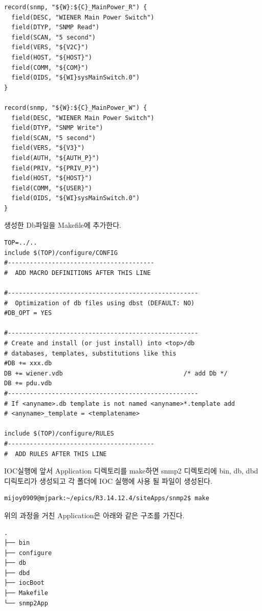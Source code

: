 \documentclass[11pt
  , a4paper
  , article
  , oneside
]{memoir}
\begin{document}
{\scriptsize
\begin{lstlisting}[style=termstyle]
record(snmp, "${W}:${C}_MainPower_R") {
  field(DESC, "WIENER Main Power Switch")
  field(DTYP, "SNMP Read")
  field(SCAN, "5 second")
  field(VERS, "${V2C}")
  field(HOST, "${HOST}")
  field(COMM, "${COM}")
  field(OIDS, "${WI}sysMainSwitch.0")
}

record(snmp, "${W}:${C}_MainPower_W") {
  field(DESC, "WIENER Main Power Switch")
  field(DTYP, "SNMP Write")
  field(SCAN, "5 second")
  field(VERS, "${V3}")
  field(AUTH, "${AUTH_P}")
  field(PRIV, "${PRIV_P}")
  field(HOST, "${HOST}")
  field(COMM, "${USER}")
  field(OIDS, "${WI}sysMainSwitch.0")
}
\end{lstlisting}
}

\hfill

생성한 Db파일을 Makefile에 추가한다.

{\scriptsize
\begin{lstlisting}[style=termstylenumber]
TOP=../..
include $(TOP)/configure/CONFIG
#----------------------------------------
#  ADD MACRO DEFINITIONS AFTER THIS LINE

#----------------------------------------------------
#  Optimization of db files using dbst (DEFAULT: NO)
#DB_OPT = YES

#----------------------------------------------------
# Create and install (or just install) into <top>/db
# databases, templates, substitutions like this
#DB += xxx.db
DB += wiener.vdb                                 /* add Db */
DB += pdu.vdb
#----------------------------------------------------
# If <anyname>.db template is not named <anyname>*.template add
# <anyname>_template = <templatename>

include $(TOP)/configure/RULES
#----------------------------------------
#  ADD RULES AFTER THIS LINE
\end{lstlisting}
}

\hfill

IOC실행에 앞서 Application 디렉토리를 make하면 snmp2 디렉토리에 bin, db, dbd 디릭토리가 생성되고 각 폴더에 IOC 실행에 사용 될 파일이 생성된다.

{\scriptsize
\begin{lstlisting}[style=termstyle]
mijoy0909@mjpark:~/epics/R3.14.12.4/siteApps/snmp2$ make
\end{lstlisting}
}


위의 과정을 거친 Application은 아래와 같은 구조를 가진다.

{\scriptsize
\begin{verbatim}
.
├── bin
├── configure
├── db
├── dbd
├── iocBoot
├── Makefile
└── snmp2App
\end{verbatim}
}
\end{document}

